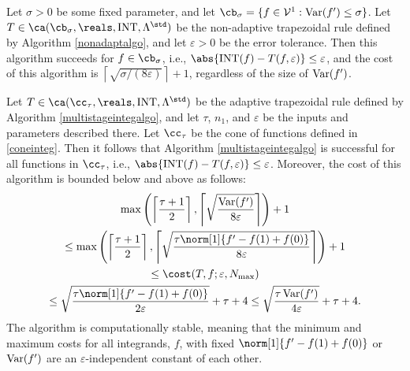 \begin{theorem} \label{multistageintegthm} 
Let $\sigma >0$ be some fixed parameter, and let $\cb_{\sigma}=\{f \in  \mathcal{V}^{1} : \Var(f')\leq \sigma\}$. Let $T \in \ca(\cb_{\sigma}, \reals, \INT, \Lambda^{\std})$ be the non-adaptive trapezoidal rule defined by Algorithm \ref{nonadaptalgo}, and let $\varepsilon>0$ be the error tolerance. Then this algorithm succeeds for $f \in \cb_{\sigma}$, i.e., $\abs{\INT(f) - T(f,\varepsilon)} \le \varepsilon$, and the cost of this algorithm is $\left \lceil \sqrt{\sigma/(8\varepsilon)}\right \rceil + 1$, regardless of the size of $\operatorname{Var}(f')$.

Let $T \in \ca(\cc_{\tau}, \reals, \INT, \Lambda^{\std})$ be the adaptive trapezoidal rule defined by Algorithm \ref{multistageintegalgo}, and let $\tau$, $n_1$, and $\varepsilon$ be the inputs and parameters described there. Let $\cc_\tau$ be the cone of functions defined in \eqref{coneinteg}.  Then it follows that Algorithm \ref{multistageintegalgo} is successful for all functions in $\cc_{\tau}$,  i.e.,  $\abs{\INT(f) - T(f,\varepsilon)} \le \varepsilon$.  Moreover, the cost of this algorithm is bounded below and above as follows:
\begin{multline}
\max \left(\left \lceil\frac{\tau+1}{2} \right \rceil, \left \lceil \sqrt{\frac{ \Var(f')}{8\varepsilon}} \right \rceil \right) +1 \\
\le \max \left(\left \lceil\frac{\tau+1}{2} \right \rceil, \left \lceil \sqrt{\frac{\tau \norm[1]{f'-f(1)+f(0)}}{8\varepsilon}} \right \rceil \right) +1 \\
\le 
\cost(T,f;\varepsilon,N_{\max}) \\
\le \sqrt{\frac{\tau \norm[1]{f'-f(1)+f(0)}}{2\varepsilon}} + \tau + 4 
\le \sqrt{\frac{\tau \Var(f') }{4\varepsilon}} + \tau + 4.
\end{multline}
The algorithm is computationally stable, meaning that the minimum and maximum costs for all integrands, $f$, with fixed $\norm[1]{f'-f(1)+f(0)}$ or $\operatorname{Var}(f')$ are an $\varepsilon$-independent constant of each other.
\end{theorem}


